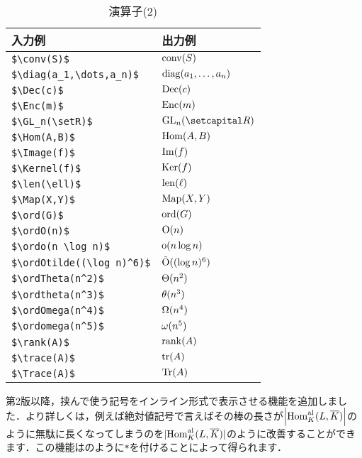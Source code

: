 \documentclass[uplatex]{jsreport}
\begin{document}
\begin{table}[htbp]
  \centering
  \caption{演算子(2)}
  \label{table:2.operaor1.2}
  \begin{tabular}{ll}\hline
    入力例 & 出力例 \\ \hline 
    \verb|$\conv(S)$| & $\operatorname{conv}(S)$ \\
    \verb|$\diag(a_1,\dots,a_n)$| & $\operatorname{diag}(a_1,\dots,a_n)$ \\
    \verb|$\Dec(c)$| & $\operatorname{Dec}(c)$ \\
    \verb|$\Enc(m)$| & $\operatorname{Enc}(m)$ \\
    \verb|$\GL_n(\setR)$| & $\GL_n(\setR)$ \\
    \verb|$\Hom(A,B)$| & $\operatorname{Hom}(A,B)$ \\
    \verb|$\Image(f)$| & $\operatorname{Im}(f)$ \\
    \verb|$\Kernel(f)$| & $\operatorname{Ker}(f)$ \\
    \verb|$\len(\ell)$| & $\operatorname{len}(\ell)$ \\
    \verb|$\Map(X,Y)$| & $\operatorname{Map}(X,Y)$ \\
    \verb|$\ord(G)$| & $\operatorname{ord}(G)$ \\
    \verb|$\ordO(n)$| & $\operatorname{O}(n)$ \\
    \verb|$\ordo(n \log n)$| & $\operatorname{o}(n \log n)$ \\
    \verb|$\ordOtilde((\log n)^6)$| & $\operatorname{\tilde{O}}((\log n)^6)$ \\
    \verb|$\ordTheta(n^2)$| & $\operatorname{\Theta}(n^2)$ \\
    \verb|$\ordtheta(n^3)$| & $\operatorname{\theta}(n^3)$ \\
    \verb|$\ordOmega(n^4)$| & $\operatorname{\Omega}(n^4)$ \\
    \verb|$\ordomega(n^5)$| & $\operatorname{\omega}(n^5)$ \\
    \verb|$\rank(A)$| & $\operatorname{rank}(A)$ \\
    \verb|$\trace(A)$| & $\operatorname{tr}(A)$ \\
    \verb|$\Trace(A)$| & $\operatorname{Tr}(A)$ \\\hline
  \end{tabular}\par
\end{table}
\par
第2版以降，挟んで使う記号をインライン形式で表示させる機能を追加しました．より詳しくは，例えば絶対値記号で言えばその棒の長さが$\abs{\Hom_{K}^{\mathrm{al}}(L,\overline{K})}$のように無駄に長くなってしまうのを$\abs*{\Hom_{K}^{\mathrm{al}}(L,\overline{K})}$のように改善することができます．この機能はのように\texttt{*}を付けることによって得られます．
\par
\end{document}

